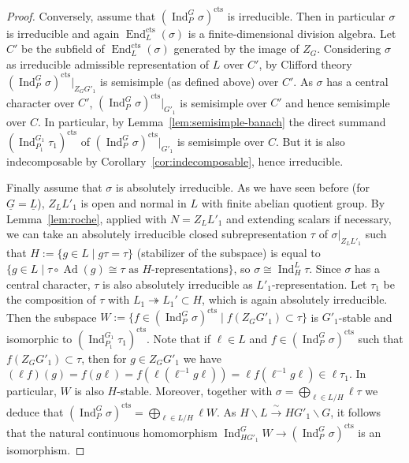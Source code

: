 \documentclass[a4paper]{amsart}
\numberwithin{equation}{section}
\theoremstyle{remark}
\theoremstyle{definition}
\DeclareMathOperator{\Ind}{Ind}
\DeclareMathOperator{\End}{End}
\DeclareMathOperator{\Ad}{Ad}
\newcommand{\alggrp}[1]{\underline{#1}}
\newcommand{\cts}{\mathrm{cts}}
\newcommand{\congto}{\xrightarrow{\,\sim\,}}
\newcommand{\onto}{\twoheadrightarrow}
\renewcommand{\simeq}{\cong}
\begin{document}
\begin{proof}
Conversely, assume that $(\Ind_{P}^{G}\sigma)^{\cts}$ is irreducible.
Then in particular $\sigma$ is irreducible and again $\End_{L}^{\cts}(\sigma)$ is a finite-dimensional division algebra.
Let $C'$ be the subfield of $\End_{L}^{\cts}(\sigma)$ generated by the image of $Z_{G}$.
Considering $\sigma$ as irreducible admissible representation of $L$ over $C'$, by Clifford theory \cite[Proposition~2.1.1]{arxiv.1912.11125} $(\Ind_{P}^{G}\sigma)^{\cts}|_{Z_{G}G'_{1}}$ is semisimple (as defined above) over $C'$.
As $\sigma$ has a central character over $C'$, $(\Ind_{P}^{G}\sigma)^{\cts}|_{G'_1}$ is semisimple over $C'$ and hence semisimple over $C$.
In particular, by Lemma~\ref{lem:semisimple-banach} the direct summand $(\Ind_{P_{1}}^{G_{1}}\tau_{1})^{\cts}$ of $(\Ind_{P}^{G}\sigma)^{\cts}|_{G'_1}$ is semisimple over $C$.
But it is also indecomposable by Corollary~\ref{cor:indecomposable}, hence irreducible.

Finally assume that $\sigma$ is absolutely irreducible.
As we have seen before (for $\alggrp{G} = \alggrp{L}$), $Z_L L'_1$ is open and normal in $L$ with finite abelian quotient group.
By Lemma~\ref{lem:roche}, applied with $N = Z_{L}L'_{1}$ and extending scalars if necessary, we can take an absolutely irreducible closed subrepresentation $\tau$ of $\sigma|_{Z_{L}L'_{1}}$ such that $H := \{g\in L\mid g\tau = \tau\}$ (stabilizer of the subspace) is equal to $\{g\in L\mid \text{$\tau\circ\Ad(g)\simeq \tau$ as $H$-representations}\}$, so $\sigma \simeq \Ind_{H}^{L}\tau$.
Since $\sigma$ has a central character, $\tau$ is also absolutely irreducible as $L'_{1}$-representation.
Let $\tau_{1}$ be the composition of $\tau$ with $L_1 \onto L_1' \subset H$, which is again absolutely irreducible.
Then the subspace $W := \{f\in (\Ind_{P}^{G}\sigma)^{\cts}\mid f(Z_G G'_{1})\subset \tau\}$ is $G'_{1}$-stable and isomorphic to $(\Ind_{P_{1}}^{G_{1}}\tau_{1})^{\cts}$.
Note that if $\ell \in L$ and $f\in (\Ind_{P}^{G}\sigma)^{\cts}$ such that $f(Z_GG'_{1})\subset \tau$, then for $g\in Z_GG'_{1}$ we have $(\ell f)(g) = f(g\ell) = f(\ell (\ell^{-1}g\ell)) = \ell f(\ell^{-1}g\ell) \in \ell \tau_1$.
In particular, $W$ is also $H$-stable.
Moreover, together with $\sigma = \bigoplus_{\ell \in L/H} \ell \tau$ we deduce that $(\Ind_{P}^{G}\sigma)^{\cts} = \bigoplus_{\ell \in L/H} \ell W$.
As $H \backslash L \congto HG'_1 \backslash G$, it follows that the natural continuous homomorphism $\Ind_{HG'_{1}}^{G} W \to (\Ind_{P}^{G}\sigma)^{\cts}$ is an isomorphism.


\end{proof}
\end{document}
